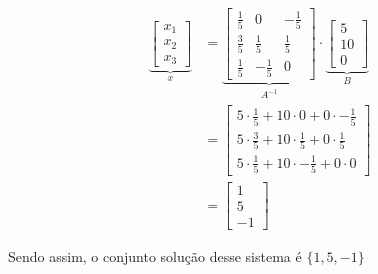 \documentclass[a4paper,12pt]{article}
\begin{document}
\begin{align*}
    \underbrace{
    \begin{bmatrix}
        x_1\\
        x_2\\
        x_3
    \end{bmatrix}}_{x}
    &=
    \underbrace{
    \begin{bmatrix}
        \frac{1}{5} & 0 & -\frac{1}{5}\\
        \frac{3}{5} & \frac{1}{5} & \frac{1}{5}\\
        \frac{1}{5} & -\frac{1}{5} & 0
    \end{bmatrix}}_{A^{-1}} \cdot
    \underbrace{
    \begin{bmatrix}
        5\\
        10\\
        0
    \end{bmatrix}}_{B}\\
    &= 
    \begin{bmatrix}
        5\cdot \frac{1}{5} + 10\cdot0 + 0\cdot-\frac{1}{5}\\
        5\cdot\frac{3}{5} + 10\cdot\frac{1}{5} + 0\cdot\frac{1}{5}\\
        5\cdot\frac{1}{5} + 10\cdot-\frac{1}{5} + 0\cdot0
    \end{bmatrix}\\
    &=
    \begin{bmatrix}
        1\\
        5\\
        -1
    \end{bmatrix}
\end{align*}

Sendo assim, o conjunto solução desse sistema é $\{1, 5, -1\}$
\end{document}
